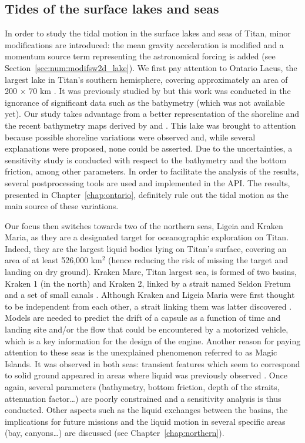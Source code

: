 \subsection{Tides of the surface lakes and seas}
In order to study the tidal motion in the surface lakes and seas of Titan, minor modifications are introduced: the mean gravity acceleration is modified and a momentum source term representing the astronomical forcing is added (see Section~\ref{sec:num:modifsw2d_lake}). We first pay attention to Ontario Lacus, the largest lake in Titan's southern hemisphere, covering approximately an area of 200 $\times$ 70 km \citep{wall2010active}. It was previously studied by \citet{tokano2010simulation} but this work was conducted in the ignorance of significant data such as the bathymetry (which was not available yet). Our study takes advantage from a better representation of the shoreline and the recent bathymetry maps derived by \cite{ventura2012electromagnetic} and \cite{hayes2016lakes}. This lake was brought to attention because possible shoreline variations were observed  \citep{lunine2009evidence,wall2010active,turtle2011shoreline,hayes2011transient} and, while several explanations were proposed, none could be asserted. Due to the uncertainties, a sensitivity study is conducted with respect to the bathymetry and the bottom friction, among other parameters. In order to facilitate the analysis of the results, several postprocessing tools are used and implemented in the API. The results, presented in Chapter~\ref{chap:ontario}, definitely rule out the tidal motion as the main source of these variations. 

Our focus then switches towards two of the northern seas, Ligeia and Kraken Maria, as they are a designated target for oceanographic exploration on Titan. Indeed, they are the largest liquid bodies lying on Titan's surface, covering an area of at least 526,000 km$^2$ (hence reducing the risk of missing the target and landing on dry ground). Kraken Mare, Titan largest sea, is formed of two basins, Kraken 1 (in the north) and Kraken 2, linked by a strait named Seldon Fretum and a set of small canals \citep{lorenz2014radar}. Although Kraken and Ligeia Maria were first thought to be independent from each other, a strait linking them was latter discovered \citep{sotin2012observations}. Models are needed to predict the drift of a capsule as a function of time and landing site and/or the flow that could be encountered by a motorized vehicle, which is a key information for the design of the engine. Another reason for paying attention to these seas is the unexplained phenomenon referred to as Magic Islands. It was observed in both seas: transient features which seem to correspond to solid ground appeared in areas where liquid was previously observed \citep{hofgartner2014transient,hofgartner2016titan}. Once again, several parameters (bathymetry, bottom friction, depth of the straits, attenuation factor\dots) are poorly constrained and a sensitivity analysis is thus conducted. Other aspects such as the liquid exchanges between the basins, the implications for future missions and the liquid motion in several specific areas (bay, canyons\dots) are discussed (see Chapter~\ref{chap:northern}).


